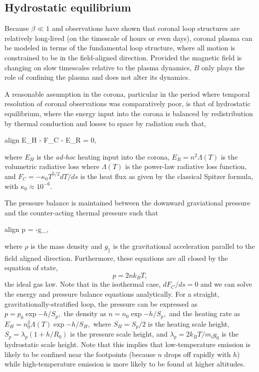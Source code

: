 	\subsection{Hydrostatic equilibrium}
	Because $\beta\ll1$ and observations have shown that coronal loop structures are relatively long-lived (on the timescale of hours or even days), coronal plasma can be modeled in terms of the fundamental loop structure, where all motion is constrained to be in the field-aligned direction. Provided the magnetic field is changing on slow timescales relative to the plasma dynamics, $B$ only plays the role of confining the plasma and does not alter its dynamics.
	
	A reasonable assumption in the corona, particular in the period where temporal resolution of coronal observations was comparatively poor, is that of hydrostatic equilibrium, where the energy input into the corona is balanced by redistribution by thermal conduction and losses to space by radiation such that,
	\begin{empheq}[box=\widefbox]{align}
		\label{eq:hydrostatic_energy}
		E_H - F_C - E_R = 0,
	\end{empheq}
	where $E_H$ is the \textit{ad-hoc} heating input into the corona, $E_R=n^2\Lambda(T)$ is the volumetric radiative loss where $\Lambda(T)$ is the power-law radiative loss function, and $F_C=-\kappa_0T^{5/2}dT/ds$ is the heat flux as given by the classical Spitzer formula, with $\kappa_0\approx10^{-6}$. 
	
	The pressure balance is maintained between the downward graviational pressure and the counter-acting thermal pressure such that 
	\begin{empheq}[box=\widefbox]{align}
		p = -\rho g_{\parallel},
	\end{empheq}
	where $\rho$ is the mass density and $g_{\parallel}$ is the gravitational acceleration parallel to the field aligned direction. Furthermore, these equations are all closed by the equation of state,
	\begin{equation}
		p=2nk_BT,
	\end{equation}
	the ideal gas law. Note that in the isothermal case, $dF_C/ds=0$ and we can solve the energy and pressure balance equations analytically. For a straight, gravitationally-stratified loop, the pressure can be expressed as $p=p_0\exp{-h/S_p},$ the density as $n=n_0\exp{-h/S_p},$ and the heating rate as $E_H=n_0^2\Lambda(T)\exp{-h/S_H},$ where $S_H=S_p/2$ is the heating scale height, $S_p=\lambda_p(1+h/R_0)$ is the pressure scale height, and $\lambda_p=2k_BT/m_ig_0$ is the hydrostatic scale height. Note that this implies that low-temperature emission is likely to be confined near the footpoints (because $n$ drops off rapidly with $h$) while high-temperature emission is more likely to be found at higher altitudes. 
	
